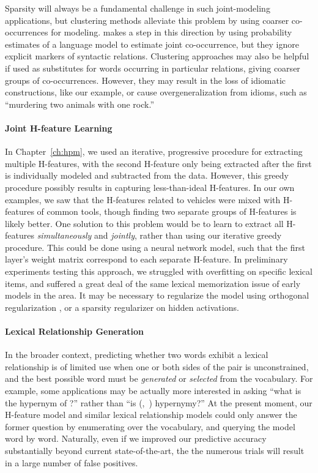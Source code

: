 Sparsity will always be a fundamental challenge in such joint-modeling
applications, but clustering methods alleviate this problem by using coarser
co-occurrences for modeling.   makes a step in this
direction by using probability estimates of a language model to estimate joint
co-occurrence, but they ignore explicit markers of syntactic relations.
Clustering approaches may also be helpful if used as substitutes for words
occurring in particular relations, giving coarser groups of co-occurrences.
However, they may result in the loss of idiomatic constructions, like our example, or
cause overgeneralization from idioms, such as ``murdering two animals with one
rock.''

\paragraph{Joint H-feature Learning}

In Chapter~\ref{ch:hpm}, we used an iterative, progressive procedure for
extracting multiple H-features, with the second H-feature only being
extracted after the first is individually modeled and subtracted from the data.
However, this greedy procedure possibly results in capturing less-than-ideal H-features.
In our own examples, we saw that the H-features related to
vehicles were mixed with H-features of common tools, though finding two
separate groups of H-features is likely better. One solution to this problem would be
to learn to extract all H-features {\em simultaneously} and {\em jointly},
rather than using our iterative greedy procedure. This could be done using a
neural network model, such that the first layer's weight matrix
correspond to each separate H-feature. In preliminary experiments testing this
approach, we struggled with overfitting on specific lexical items, and suffered
a great deal of the same lexical memorization issue of early models in the
area. It may be necessary to regularize the model using orthogonal
regularization \cite{brock:2017:iclr}, or a sparsity regularizer on hidden
activations.

\paragraph{Lexical Relationship Generation}

In the broader context, predicting whether two words exhibit a lexical
relationship is of limited use when one or both sides of the pair
is unconstrained, and the best possible word must be {\em generated} or
{\em selected} from the vocabulary. For example, some applications may be
actually more interested in asking ``what is the hypernym of ?'' rather
than ``is (,~) hypernymy?'' At the present moment, our
H-feature model and similar lexical relationship models could only answer the
former question by enumerating over the vocabulary, and querying the model word
by word. Naturally, even if we improved our predictive accuracy substantially
beyond current state-of-the-art, the the numerous trials will result
in a large number of false positives.

